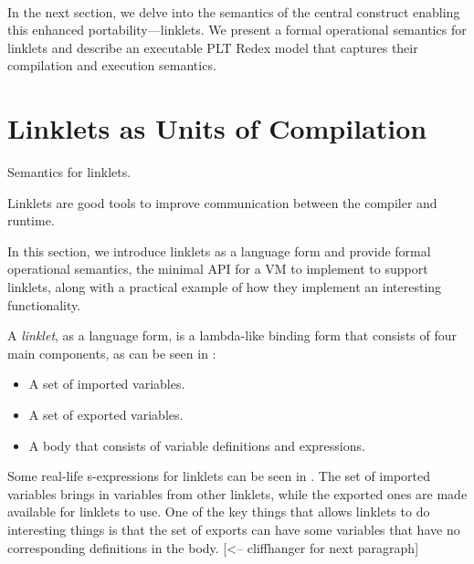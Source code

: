 		\paragraph{}%
			In the next section, we delve into the semantics of the central construct enabling this enhanced portability—linklets. We present a formal operational semantics for linklets and describe an executable PLT Redex model that captures their compilation and execution semantics.


	\section[\texorpdfstring{Linklets as Units of Compilation}{Using Linklets}]{Linklets as Units of Compilation}
		\label{section:linklet-semantics}

		\begin{mainpoint}
			Semantics for linklets.

			Linklets are good tools to improve communication between the compiler and runtime.
		\end{mainpoint}

		\begin{paragraph-here}
			In this section, we introduce linklets as a language form and provide formal operational semantics, the minimal API for a VM to implement to support linklets, along with a practical example of how they implement an interesting functionality.
		\end{paragraph-here}


		\begin{paragraph-here}
			A \emph{linklet}, as a language form, is a lambda-like binding form that consists of four main components, as can be seen in :

			\begin{itemize}
				\item A set of imported variables.
				\item A set of exported variables.
				\item A body that consists of variable definitions and expressions.
			\end{itemize}

			Some real-life s-expressions for linklets can be seen in . The set of imported variables brings in variables from other linklets, while the exported ones are made available for linklets to use. One of the key things that allows linklets to do interesting things is that the set of exports can have some variables that have no corresponding definitions in the body. [<-- cliffhanger for next paragraph]
		\end{paragraph-here}

